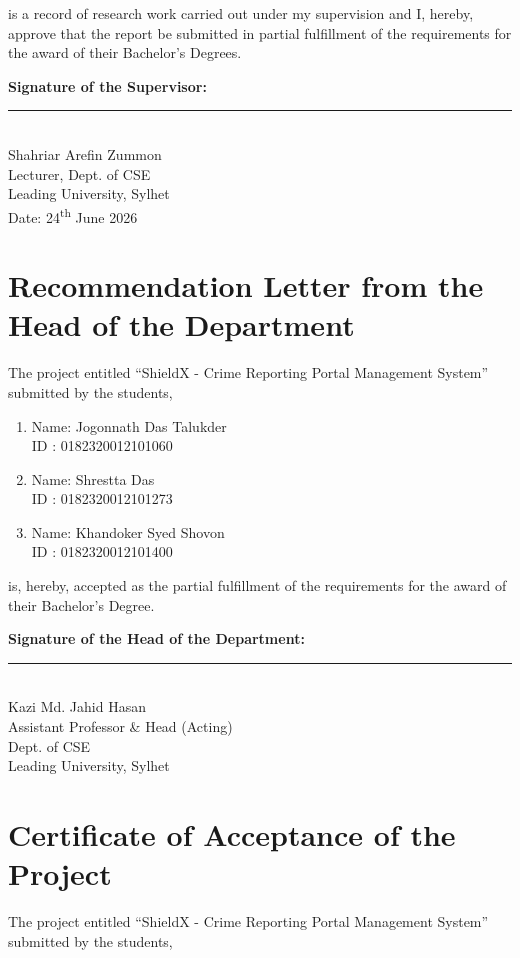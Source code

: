 \documentclass[12pt, a4paper, twoside]{report}
\begin{document}
is a record of research work carried out under my supervision and I, hereby, approve that the report be submitted in partial fulfillment of the requirements for the award of their Bachelor's Degrees.
\vspace{2cm}

\noindent\textbf{Signature of the Supervisor:}\\[1.5cm]
\noindent\rule{6cm}{0.4pt}\\
Shahriar Arefin Zummon\\
Lecturer, Dept. of CSE\\
Leading University, Sylhet\\
Date: 24\textsuperscript{th} June 2026

\clearpage

\chapter*{Recommendation Letter from the Head of the Department}
The project entitled ``ShieldX - Crime Reporting Portal Management System'' submitted by the students,

\begin{enumerate}[label=\arabic*.]
    \item Name: Jogonnath Das Talukder\\
          ID : 0182320012101060
    \item Name: Shrestta Das\\
          ID : 0182320012101273
    \item Name: Khandoker Syed Shovon\\
          ID : 0182320012101400
\end{enumerate}

is, hereby, accepted as the partial fulfillment of the requirements for the award of their Bachelor's Degree.
\vspace{2cm}

\noindent\textbf{Signature of the Head of the Department:}\\[1.5cm]
\noindent\rule{6cm}{0.4pt}\\
Kazi Md. Jahid Hasan\\
Assistant Professor \& Head (Acting)\\
Dept. of CSE\\
Leading University, Sylhet

\clearpage

\chapter*{Certificate of Acceptance of the Project}
The project entitled ``ShieldX - Crime Reporting Portal Management System'' submitted by the students,
\end{document}
